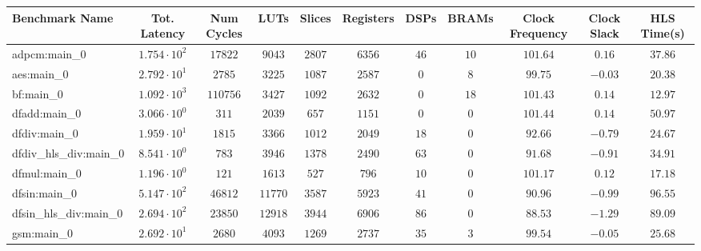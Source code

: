 \begin{tabular}{|l|c|c|c|c|c|c|c|c|c|c|}
\hline
Benchmark Name          & Tot. Latency           & Num Cycles & LUTs      & Slices    & Registers & DSPs    & BRAMs   & Clock Frequency & Clock Slack & HLS Time(s) \\
\hline
adpcm:main\_0           & $ 1.754 \cdot 10^{2} $ & $ 17822  $ & $ 9043  $ & $ 2807  $ & $ 6356  $ & $ 46  $ & $ 10  $ & $ 101.64      $ & $ 0.16    $ & $ 37.86   $ \\
aes:main\_0             & $ 2.792 \cdot 10^{1} $ & $ 2785   $ & $ 3225  $ & $ 1087  $ & $ 2587  $ & $ 0   $ & $ 8   $ & $ 99.75       $ & $ -0.03   $ & $ 20.38   $ \\
bf:main\_0              & $ 1.092 \cdot 10^{3} $ & $ 110756 $ & $ 3427  $ & $ 1092  $ & $ 2632  $ & $ 0   $ & $ 18  $ & $ 101.43      $ & $ 0.14    $ & $ 12.97   $ \\
dfadd:main\_0           & $ 3.066 \cdot 10^{0} $ & $ 311    $ & $ 2039  $ & $ 657   $ & $ 1151  $ & $ 0   $ & $ 0   $ & $ 101.44      $ & $ 0.14    $ & $ 50.97   $ \\
dfdiv:main\_0           & $ 1.959 \cdot 10^{1} $ & $ 1815   $ & $ 3366  $ & $ 1012  $ & $ 2049  $ & $ 18  $ & $ 0   $ & $ 92.66       $ & $ -0.79   $ & $ 24.67   $ \\
dfdiv\_hls\_div:main\_0 & $ 8.541 \cdot 10^{0} $ & $ 783    $ & $ 3946  $ & $ 1378  $ & $ 2490  $ & $ 63  $ & $ 0   $ & $ 91.68       $ & $ -0.91   $ & $ 34.91   $ \\
dfmul:main\_0           & $ 1.196 \cdot 10^{0} $ & $ 121    $ & $ 1613  $ & $ 527   $ & $ 796   $ & $ 10  $ & $ 0   $ & $ 101.17      $ & $ 0.12    $ & $ 17.18   $ \\
dfsin:main\_0           & $ 5.147 \cdot 10^{2} $ & $ 46812  $ & $ 11770 $ & $ 3587  $ & $ 5923  $ & $ 41  $ & $ 0   $ & $ 90.96       $ & $ -0.99   $ & $ 96.55   $ \\
dfsin\_hls\_div:main\_0 & $ 2.694 \cdot 10^{2} $ & $ 23850  $ & $ 12918 $ & $ 3944  $ & $ 6906  $ & $ 86  $ & $ 0   $ & $ 88.53       $ & $ -1.29   $ & $ 89.09   $ \\
gsm:main\_0             & $ 2.692 \cdot 10^{1} $ & $ 2680   $ & $ 4093  $ & $ 1269  $ & $ 2737  $ & $ 35  $ & $ 3   $ & $ 99.54       $ & $ -0.05   $ & $ 25.68   $ \\

\end{tabular}
